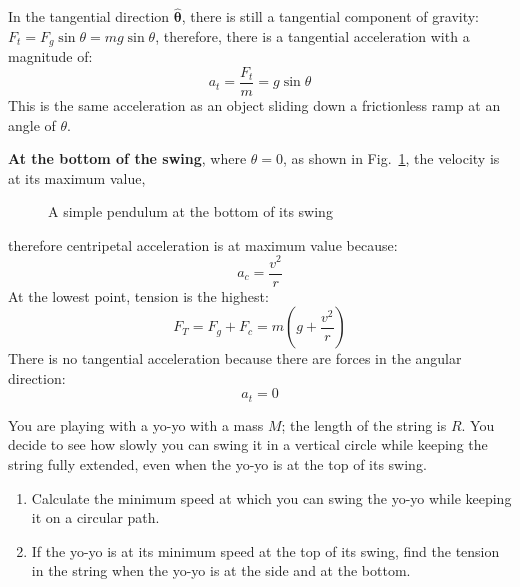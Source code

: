 In the tangential direction $\hat{\bm\theta}$, there is still a tangential
component of gravity: $F_t=F_g\sin\theta=mg\sin\theta$, therefore, there is a
tangential acceleration with a magnitude of:
\begin{equation}
  a_t=\frac{F_t}m=g\sin\theta
\end{equation}
This is the same acceleration as an object sliding down a frictionless ramp at
an angle of $\theta$.

\textbf{At the bottom of the swing}, where $\theta=0$, as shown in
Fig.~\ref{fig:bottom-swing}, the velocity is at its maximum value,
\begin{figure}[ht]
  \centering
  \caption{A simple pendulum at the bottom of its swing}
  \label{fig:bottom-swing}
\end{figure}
therefore centripetal acceleration is at maximum value because:
\begin{equation}
    a_c=\frac{v^2}r
\end{equation}
At the lowest point, tension is the highest:
\begin{equation}
  F_T=F_g+F_c=m\left(g+\frac{v^2}r\right)
\end{equation}
There is no tangential acceleration because there are forces in the angular
direction:
\begin{equation}
  a_t=0
\end{equation}  




\begin{example}
  You are playing with a yo-yo with a mass $M$; the length of the string is
  $R$. You decide to see how slowly you can swing it in a vertical circle
  while keeping the string fully extended, even when the yo-yo is at the top of
  its swing.
  \begin{enumerate}%
  \item Calculate the minimum speed at which you can swing the yo-yo while
    keeping it on a circular path.
  \item If the yo-yo is at its minimum speed at the top of its swing, find the
    tension in the string when the yo-yo is at the side and at the bottom.
  \end{enumerate}
\end{example}




